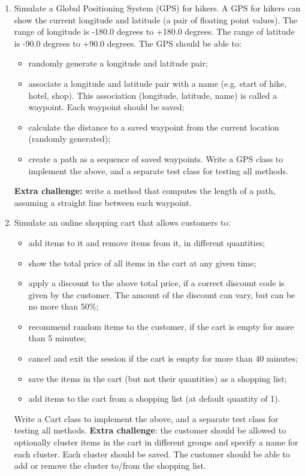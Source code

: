 \documentclass{article}
\begin{document}
\begin{enumerate}[label=11ø.\arabic*,start=0]
\item Simulate a Global Positioning System (GPS) for hikers. A GPS for hikers can show the current longitude and latitude (a pair of floating point values). The range of longitude is -180.0 degrees to +180.0 degrees. The range of latitude is -90.0 degrees to +90.0 degrees. The GPS should be able to: 
\begin{itemize}
\item	randomly generate a longitude and latitude pair;
\item	associate a longitude and latitude pair with a name (e.g. start of hike, hotel, shop). This association (longitude, latitude, name) is called a waypoint. Each waypoint should be saved;

\item	calculate the distance to a saved waypoint from the current location (randomly generated);
\item	create a path as a sequence of saved waypoints.
Write a GPS class to implement the above, and a separate test class for testing all methods.
\end{itemize}
\textbf{Extra challenge:} write a method that computes the length of a path, assuming a straight line between each waypoint.

\item Simulate an online shopping cart that allows customers to:
\begin{itemize}
\item	add items to it and remove items from it, in different quantities;
\item	show the total price of all items in the cart at any given time;
\item	apply a discount to the above total price, if a correct discount code is given by the customer. The amount of the discount can vary, but can be no more than 50\%;
\item	recommend random items to the customer, if the cart is empty for more than 5 minutes;
\item	cancel and exit the session if the cart is empty for more than 40 minutes;
\item	save the items in the cart (but not their quantities) as a shopping list;
\item	add items to the cart from a shopping list (at default quantity of 1).
\end{itemize}
Write a Cart class to implement the above, and a separate test class for testing all methods.
\textbf{Extra challenge}: the customer should be allowed to optionally cluster items in the cart in different groups and specify a name for each cluster. Each cluster should be saved. The customer should be able to add or remove the cluster to/from the shopping list.  


\end{enumerate}
\end{document}
